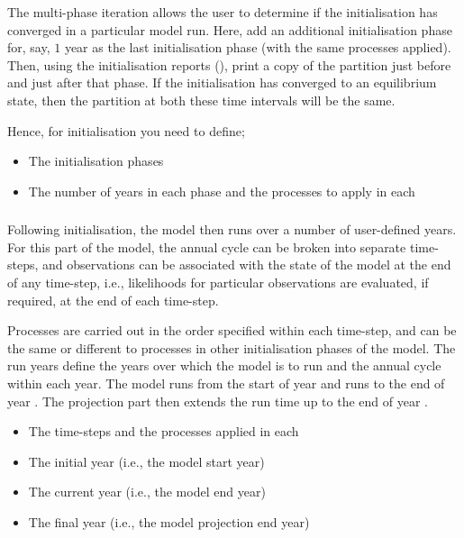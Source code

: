 The multi-phase iteration allows the user to determine if the initialisation has converged in a particular model run. Here, add an additional initialisation phase for, say, $1$ year as the last initialisation phase (with the same processes applied). Then, using the initialisation reports (), print a copy of the partition just before and just after that phase. If the initialisation has converged to an equilibrium state, then the partition at both these time intervals will be the same.

Hence, for initialisation you need to define;
\begin{itemize}
  \item The initialisation phases
  \item The number of years in each phase and the processes to apply in each
\end{itemize}

\subsubsection{}

Following initialisation, the model then runs over a number of user-defined years. For this part of the model, the annual cycle can be broken into separate time-steps, and observations can be associated with the state of the model at the end of any time-step, i.e., likelihoods for particular observations are evaluated, if required, at the end of each time-step. 

Processes are carried out in the order specified within each time-step, and can be the same or different to processes in other initialisation phases of the model. The run years define the years over which the model is to run and the annual cycle within each year. The model runs from the start of year  and runs to the end of year . The projection part then extends the run time up to the end of year . 

\begin{itemize}
  \item The time-steps and the processes applied in each
  \item The initial year (i.e., the model start year)
  \item The current year (i.e., the model end year)
  \item The final year (i.e., the model projection end year)
\end{itemize}


